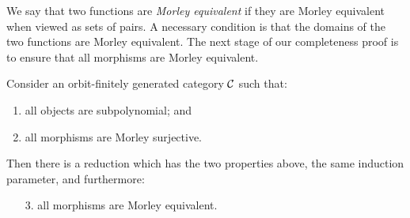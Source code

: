 We say that two functions  are \emph{Morley equivalent} if they are Morley equivalent when viewed as sets of pairs. A necessary condition is that the domains of the two functions are Morley equivalent. The next stage of our completeness proof is to ensure that all morphisms are Morley equivalent.

\begin{lemma}\label{lem:morely-equivalent-morphisms}
    Consider an orbit-finitely generated category ${\mathcal C}$ such that: 
    \begin{enumerate}
        \item all objects are subpolynomial; and
        \item all morphisms are Morley surjective.
    \end{enumerate}
    Then there is a reduction which has the two properties above,  the same induction parameter,  and furthermore:
    \begin{enumerate}
        \item[3.] all morphisms are Morley equivalent.
    \end{enumerate}
\end{lemma}

